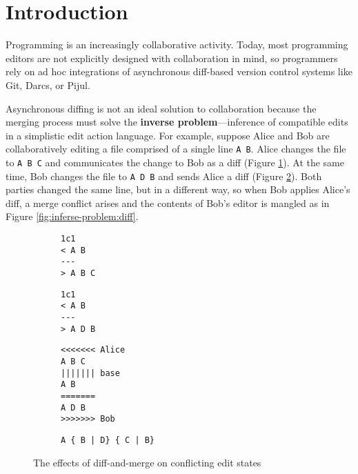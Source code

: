 
\section{Introduction}%
\label{sec:Introduction}


Programming is an increasingly collaborative activity.
Today, most programming editors are not explicitly designed with collaboration in mind,
so programmers rely on ad hoc integrations of asynchronous diff-based version control systems like Git, Darcs, or Pijul.

Asynchronous diffing is not an ideal solution to collaboration because
the merging process must solve the \textbf{inverse problem}---inference of compatible edits in a simplistic edit action language.
For example, suppose Alice and Bob are collaboratively editing a file comprised of a single line \verb|A B|.
Alice changes the file to \verb|A B C| and communicates the change to Bob as a diff (Figure \ref{fig:inverse-problem:alice}).
At the same time, Bob changes the file to \verb|A D B| and sends Alice a diff (Figure \ref{fig:inverse-problem:bob}).
Both parties changed the same line, but in a different way,
so when Bob applies Alice's diff, a merge conflict arises and the contents of Bob's editor is mangled as in Figure \ref{fig:inferse-problem:diff}.

\begin{figure}[H]
  \begin{subfigure}{.45\linewidth}
\begin{verbatim}
1c1
< A B
---
> A B C
\end{verbatim}
    \label{fig:inverse-problem:alice}
  \end{subfigure}
  \hfil
  \begin{subfigure}{.45\linewidth}
\begin{verbatim}
1c1
< A B
---
> A D B
\end{verbatim}
    \label{fig:inverse-problem:bob}
  \end{subfigure}

  \begin{subfigure}{.45\linewidth}
\begin{verbatim}
<<<<<<< Alice
A B C
||||||| base
A B
=======
A D B
>>>>>>> Bob
\end{verbatim}
    \label{fig:inverse-problem:diff}
  \end{subfigure}
  \hfil
  \begin{subfigure}{.45\linewidth}
\begin{verbatim}
A { B | D} { C | B}
\end{verbatim}
    \label{fig:inverse-problem:grove}
  \end{subfigure}
  \label{fig:inverse-problem}
  \caption{The effects of diff-and-merge on conflicting edit states}
\end{figure}

